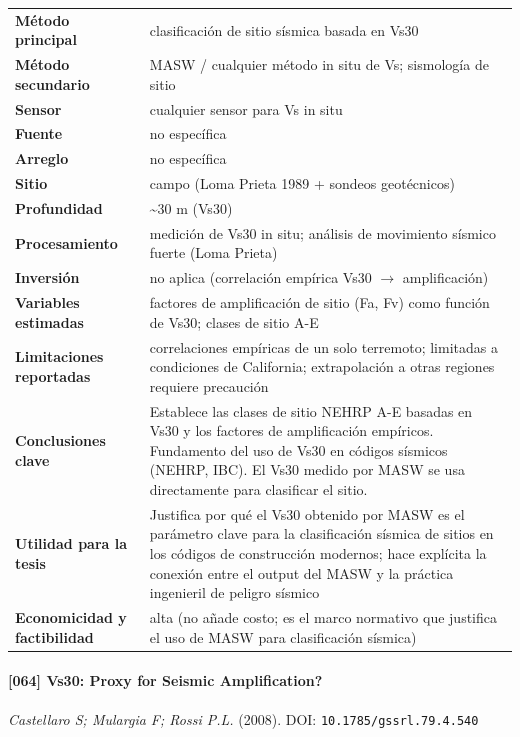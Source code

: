 \begin{center}\scriptsize
\begin{tabularx}{\textwidth}{@{}>{\bfseries}p{3.3cm} X@{}}
\toprule
M\'etodo principal & clasificación de sitio sísmica basada en Vs30 \\
M\'etodo secundario & MASW / cualquier método in situ de Vs; sismología de sitio \\
Sensor & cualquier sensor para Vs in situ \\
Fuente & no específica \\
Arreglo & no específica \\
Sitio & campo (Loma Prieta 1989 + sondeos geotécnicos) \\
Profundidad & \textasciitilde{}30 m (Vs30) \\
Procesamiento & medición de Vs30 in situ; análisis de movimiento sísmico fuerte (Loma Prieta) \\
Inversi\'on & no aplica (correlación empírica Vs30 $\rightarrow$ amplificación) \\
Variables estimadas & factores de amplificación de sitio (Fa, Fv) como función de Vs30; clases de sitio A-E \\
Limitaciones reportadas & correlaciones empíricas de un solo terremoto; limitadas a condiciones de California; extrapolación a otras regiones requiere precaución \\
Conclusiones clave & Establece las clases de sitio NEHRP A-E basadas en Vs30 y los factores de amplificación empíricos. Fundamento del uso de Vs30 en códigos sísmicos (NEHRP, IBC). El Vs30 medido por MASW se usa directamente para clasificar el sitio. \\
Utilidad para la tesis & Justifica por qué el Vs30 obtenido por MASW es el parámetro clave para la clasificación sísmica de sitios en los códigos de construcción modernos; hace explícita la conexión entre el output del MASW y la práctica ingenieril de peligro sísmico \\
Economicidad y factibilidad & alta (no añade costo; es el marco normativo que justifica el uso de MASW para clasificación sísmica) \\
\bottomrule
\end{tabularx}
\end{center}

\paragraph{[064] Vs30: Proxy for Seismic Amplification?} \emph{Castellaro S; Mulargia F; Rossi P.L.} (2008).
{\scriptsize DOI: \texttt{10.1785/gssrl.79.4.540}}

